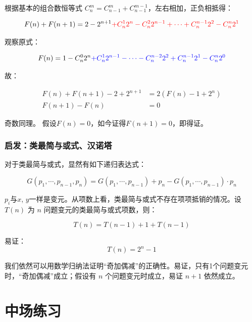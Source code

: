 \documentclass[12pt]{ctexart}
\begin{document}
根据基本的组合数恒等式 $C_{n}^{m} = C_{n-1}^{m} + C_{n-1}^{m-1}$，左右相加，正负相抵得：

\begin{equation}
    F(n) + F(n+1) = 2 - 2^{n+1} \textcolor{red}{+ C_n^1 2^n - C_n^2 2^{n-1} + \cdots + C_n^{n-1} 2^2 - C_n^{n} 2^1}
\end{equation}

观察原式：

\begin{equation}
    F(n) = 1 - C_n^0 2^n \textcolor{blue}{+ C_n^1 2^{n-1} - \cdots - C_n^{n-2} 2^{2} + C_n^{n-1} 2^{1} - C_n^{n} 2^{0}}\\
\end{equation}

故：

\begin{align}
    F(n) + F(n+1) - 2 + 2^{n+1} &= 2(F(n) -1 + 2^n)\\
    F(n+1) - F(n) &= 0
\end{align}

奇数同理。
假设$F(n)=0$，如今证得$F(n+1)=0$，即得证。

\subsubsection{启发：类最简与或式、汉诺塔}

对于类最简与或式，显然有如下递归表达式：

\begin{equation}
    G(p_1, \cdots ,p_{n-1}, p_{n}) = G(p_1, \cdots ,p_{n-1}) + p_{n} - G(p_1, \cdots ,p_{n-1}) \cdot p_{n}
\end{equation}

$p_i$与$x$, $y$一样是变元。从项数上看，类最简与或式不存在项项抵销的情况。设 $T(n)$ 为 $n$ 问题变元的类最简与或式项数，则：

\begin{equation}
    T(n) = T(n-1) + 1 + T(n-1)
\end{equation}

易证：
\begin{equation}
    T(n) = 2^{n} - 1
\end{equation}

我们依然可以用数学归纳法证明“奇加偶减”的正确性。易证，只有1个问题变元时，“奇加偶减”成立；假设有 $n$ 个问题变元时成立，易证 $n+1$ 依然成立。



\newpage
\section{中场练习}
\end{document}
